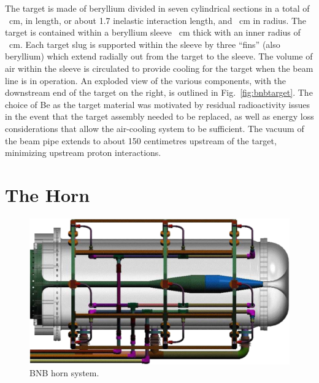  The target is made of beryllium divided in seven cylindrical sections in a total of ~cm, %
 in length, or about 1.7 inelastic interaction length, and ~cm in radius.
 The target is contained within a beryllium sleeve ~cm thick with an inner radius of ~cm.
 Each target slug is supported within the sleeve by three ``fins'' (also beryllium) %
 which extend radially out from the target to the sleeve.
 The volume of air within the sleeve is circulated to provide cooling for the target when the beam %
 line is in operation.
 An exploded view of the various components, with the downstream end of the target on the right, %
 is outlined in Fig.~\ref{fig:bnbtarget}.
 The choice of Be as the target material was motivated by residual radioactivity issues %
 in the event that the target assembly needed to be replaced, as well as energy loss %
 considerations that allow the air-cooling system to be sufficient.
 The vacuum of the beam pipe extends to about 150 centimetres upstream of the target, %
 minimizing upstream proton interactions.

 \section{The Horn}
 \label{sec:horn}

 \begin{figure}
  \centering
  \includegraphics[scale=.2]{pics/bnbhorn}
  \caption{BNB horn system.}
  \label{fig:bnbhorn}
 \end{figure}

